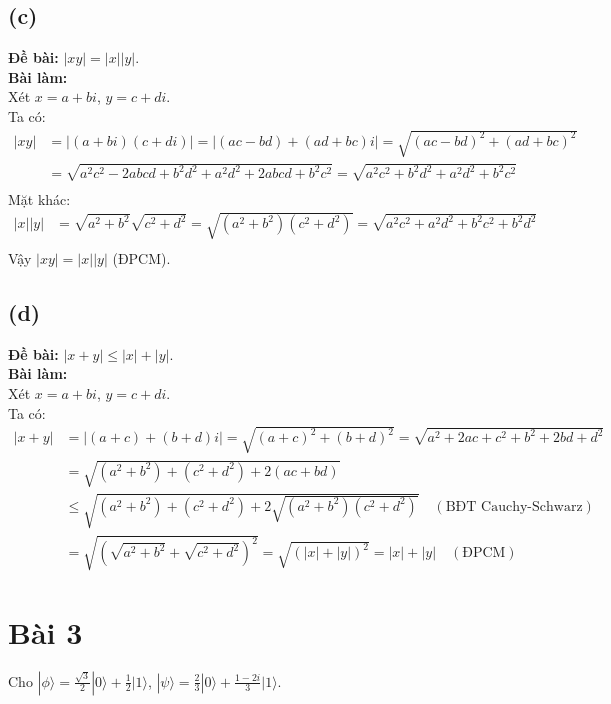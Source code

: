\subsection{(c)}
\textbf{Đề bài:} $|xy|=|x||y|$.\\
\textbf{Bài làm:}
\\Xét $x=a+bi$, $y=c+di$. \\
Ta có:
\begin{align}
    |xy| & = |(a + bi)(c + di)| = |(ac - bd) + (ad + bc)i| = \sqrt{(ac - bd)^{2} + (ad + bc)^{2}}                                                \\
         & = \sqrt{a^{2}c^{2} - 2abcd + b^{2}d^{2} + a^{2}d^{2} + 2abcd + b^{2}c^{2}} = \sqrt{a^{2}c^{2} + b^{2}d^{2} + a^{2}d^{2} + b^{2}c^{2}} \\
\end{align}
Mặt khác:
\begin{align}
    |x||y| & = \sqrt{a^{2} + b^{2}}\sqrt{c^{2} + d^{2}} = \sqrt{(a^{2} + b^{2})(c^{2} + d^{2})} = \sqrt{a^{2}c^{2} + a^{2}d^{2} + b^{2}c^{2} + b^{2}d^{2}} \\
\end{align}
Vậy $|xy| = |x||y|$ (ĐPCM).

\subsection{(d)}
\textbf{Đề bài:} $|x+y|\le|x|+|y|$.\\
\textbf{Bài làm:}\\
Xét $x=a+bi$, $y=c+di$. \\
Ta có:
\begin{align*}
    |x+y| & = |(a+c) + (b+d)i| = \sqrt{(a+c)^{2} + (b+d)^{2}} = \sqrt{a^{2} + 2ac + c^{2} + b^{2} + 2bd + d^{2}}                    \\
          & = \sqrt{(a^{2} + b^{2}) + (c^{2} + d^{2}) + 2(ac + bd)}                                                                 \\
          & \le \sqrt{(a^{2} + b^{2}) + (c^{2} + d^{2}) + 2\sqrt{(a^{2} + b^{2})(c^{2} + d^{2})}} \quad (\text{BĐT Cauchy-Schwarz}) \\
          & = \sqrt{(\sqrt{a^{2} + b^{2}} + \sqrt{c^{2} + d^{2}})^{2}} = \sqrt{(|x| + |y|)^2} =|x| + |y| \quad (\text{ĐPCM})
\end{align*}

\section{Bài 3}
Cho $|\phi\rangle=\frac{\sqrt{3}}{2}|0\rangle+\frac{1}{2}|1\rangle$, $|\psi\rangle=\frac{2}{3}|0\rangle+\frac{1-2i}{3}|1\rangle$.

